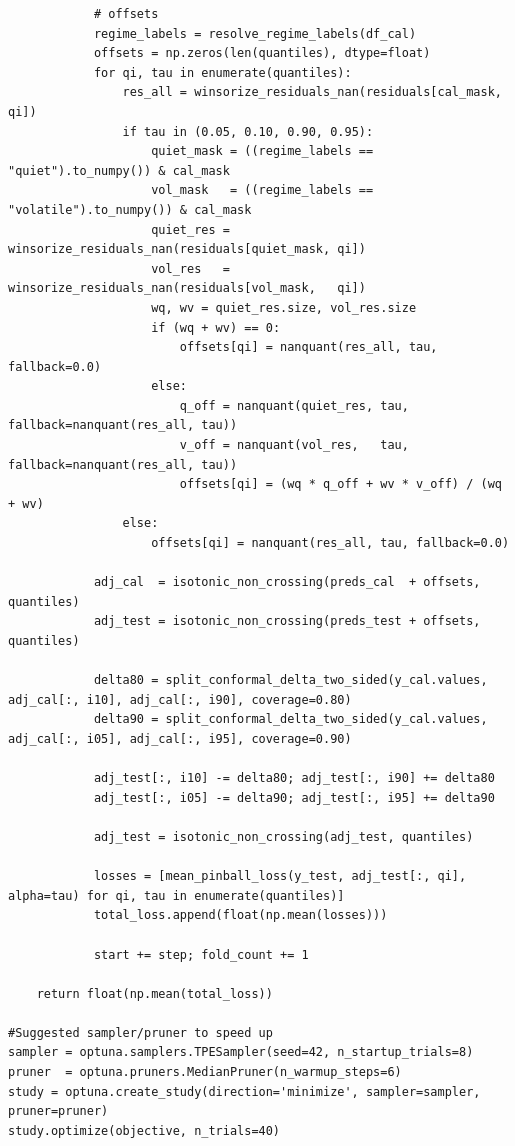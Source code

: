 \documentclass[
  a4paper,
  DIV=11,
  numbers=noendperiod]{scrreprt}
\begin{document}
\begin{verbatim}
            # offsets
            regime_labels = resolve_regime_labels(df_cal)
            offsets = np.zeros(len(quantiles), dtype=float)
            for qi, tau in enumerate(quantiles):
                res_all = winsorize_residuals_nan(residuals[cal_mask, qi])
                if tau in (0.05, 0.10, 0.90, 0.95):
                    quiet_mask = ((regime_labels == "quiet").to_numpy()) & cal_mask
                    vol_mask   = ((regime_labels == "volatile").to_numpy()) & cal_mask
                    quiet_res = winsorize_residuals_nan(residuals[quiet_mask, qi])
                    vol_res   = winsorize_residuals_nan(residuals[vol_mask,   qi])
                    wq, wv = quiet_res.size, vol_res.size
                    if (wq + wv) == 0:
                        offsets[qi] = nanquant(res_all, tau, fallback=0.0)
                    else:
                        q_off = nanquant(quiet_res, tau, fallback=nanquant(res_all, tau))
                        v_off = nanquant(vol_res,   tau, fallback=nanquant(res_all, tau))
                        offsets[qi] = (wq * q_off + wv * v_off) / (wq + wv)
                else:
                    offsets[qi] = nanquant(res_all, tau, fallback=0.0)

            adj_cal  = isotonic_non_crossing(preds_cal  + offsets, quantiles)
            adj_test = isotonic_non_crossing(preds_test + offsets, quantiles)

            delta80 = split_conformal_delta_two_sided(y_cal.values, adj_cal[:, i10], adj_cal[:, i90], coverage=0.80)
            delta90 = split_conformal_delta_two_sided(y_cal.values, adj_cal[:, i05], adj_cal[:, i95], coverage=0.90)

            adj_test[:, i10] -= delta80; adj_test[:, i90] += delta80
            adj_test[:, i05] -= delta90; adj_test[:, i95] += delta90

            adj_test = isotonic_non_crossing(adj_test, quantiles)

            losses = [mean_pinball_loss(y_test, adj_test[:, qi], alpha=tau) for qi, tau in enumerate(quantiles)]
            total_loss.append(float(np.mean(losses)))

            start += step; fold_count += 1

    return float(np.mean(total_loss))

#Suggested sampler/pruner to speed up
sampler = optuna.samplers.TPESampler(seed=42, n_startup_trials=8)
pruner  = optuna.pruners.MedianPruner(n_warmup_steps=6)
study = optuna.create_study(direction='minimize', sampler=sampler, pruner=pruner)
study.optimize(objective, n_trials=40)


\end{verbatim}
\end{document}
